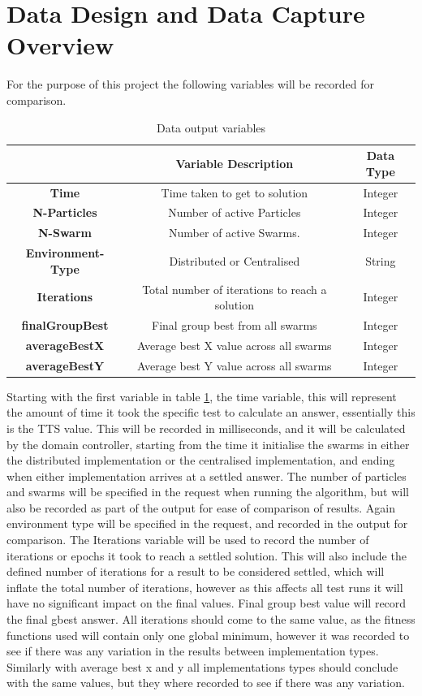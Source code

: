 \documentclass[oneside,12pt]{book}
\begin{document}
\section{Data Design and Data Capture Overview}
For the purpose of this project the following variables will be recorded for comparison. 
\begin{table}[H]
  \centering
    \begin{tabular}{| c | c | c |}
    \hline
     & \textbf{Variable Description} & \textbf{Data Type} \\ \hline
    \textbf{Time} & Time taken to get to solution & Integer \\ \hline
    \textbf{N-Particles} & Number of active Particles  & Integer \\ \hline
    \textbf{N-Swarm} & Number of active Swarms. & Integer \\ \hline
    \textbf{Environment-Type} & Distributed or Centralised & String \\ \hline
    \textbf{Iterations} & Total number of iterations to reach a solution & Integer \\ \hline
    \textbf{finalGroupBest} & Final group best from all swarms & Integer \\ \hline
    \textbf{averageBestX} & Average best X value across all swarms  & Integer \\ \hline
    \textbf{averageBestY} & Average best Y value across all swarms & Integer \\ \hline
    \end{tabular}
  \caption{Data output variables}
  \label{tab:data_output_design}
\end{table}
Starting with the first variable in table \ref{tab:data_output_design}, the time variable, this will represent the amount of time it took the specific test to calculate an answer, essentially this is the TTS value. This will be recorded in milliseconds, and it will be calculated by the domain controller, starting from the time it initialise the swarms in either the distributed implementation or the centralised implementation, and ending when either implementation arrives at a settled answer. The number of particles and swarms will be specified in the request when running the algorithm, but will also be recorded as part of the output for ease of comparison of results. Again environment type will be specified in the request, and recorded in the output for comparison. The Iterations variable will be used to record the number of iterations or epochs it took to reach a settled solution. This will also include the defined number of iterations for a result to be considered settled, which will inflate the total number of iterations, however as this affects all test runs it will have no significant impact on the final values. Final group best value will record the final gbest answer. All iterations should come to the same value, as the fitness functions used will contain only one global minimum, however it was recorded to see if there was any variation in the results between implementation types. Similarly with average best x and y all implementations types should conclude with the same values, but they where recorded to see if there was any variation.
\end{document}
